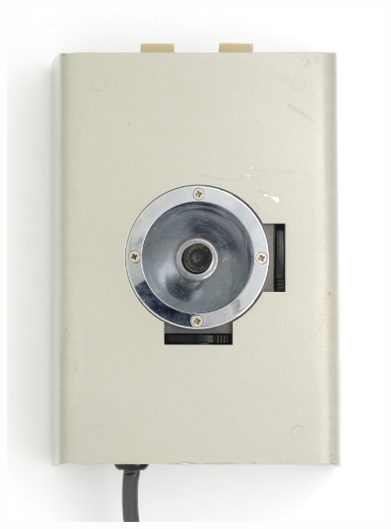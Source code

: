 \documentclass[11pt, a4paper]{article}
\begin{document}
\begin{figure}[h]
    \centering
    \includegraphics[scale=0.3]{1975_Tektronix_4952_Joystick/top_30.jpg}

\end{figure}
\end{document}
